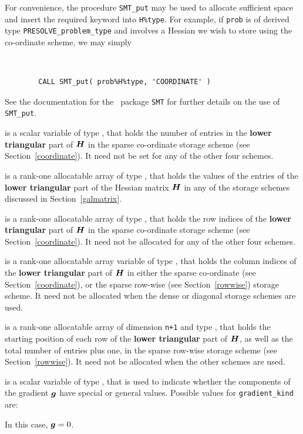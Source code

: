\documentclass{galahad}
\newcommand{\packagename}{PRESOLVE}
\begin{document}
\begin{description}
\begin{description}
For convenience, the procedure {\tt SMT\_put}
may be used to allocate sufficient space and insert the required keyword
into {\tt H\%type}.
For example, if {\tt prob} is of derived type {\tt \packagename\_problem\_type}
and involves a Hessian we wish to store using the co-ordinate scheme,
we may simply
{\tt
\begin{verbatim}
        CALL SMT_put( prob%H%type, 'COORDINATE' )
\end{verbatim}
}
\noindent
See the documentation for the \galahad\ package {\tt SMT}
for further details on the use of {\tt SMT\_put}.

 is a scalar variable of type \integer, that
holds the number of entries in the {\bf lower triangular} part of ${\bm{H}}$
in the sparse co-ordinate storage scheme (see Section~\ref{coordinate}).
It need not be set for any of the other four schemes.

 is a rank-one allocatable array of type \realdp, that holds
the values of the entries of the {\bf lower triangular} part
of the Hessian matrix ${\bm{H}}$ in any of the
storage schemes discussed in Section~\ref{galmatrix}.

 is a rank-one allocatable array of type \integer,
that holds the row indices of the {\bf lower triangular} part of ${\bm{H}}$
in the sparse co-ordinate storage
scheme (see Section~\ref{coordinate}).
It need not be allocated for any of the other four schemes.

 is a rank-one allocatable array variable of type \integer,
that holds the column indices of the {\bf lower triangular} part of
${\bm{H}}$ in either the sparse co-ordinate
(see Section~\ref{coordinate}), or the sparse row-wise
(see Section~\ref{rowwise}) storage scheme.
It need not be allocated when the dense or diagonal storage schemes are used.

 is a rank-one allocatable array of dimension {\tt n+1} and type
\integer, that holds the starting position of
each row of the {\bf lower triangular} part of ${\bm{H}}$, as well
as the total number of entries plus one, in the sparse row-wise storage
scheme (see Section~\ref{rowwise}). It need not be allocated when the
other schemes are used.

\end{description}

 is a scalar variable of type \integer,
that is used to indicate whether the components of the gradient ${\bm{g}}$
have special or general values. Possible values for {\tt gradient\_kind} are:
\begin{description}
  In this case, ${\bm{g}} = 0$.


\end{description}
\end{description}
\end{document}
